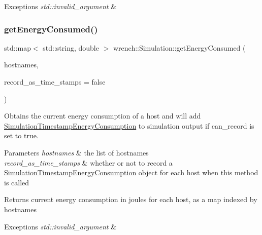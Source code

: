 \begin{DoxyExceptions}{Exceptions}
{\em std\+::invalid\+\_\+argument} & \\
\hline
\end{DoxyExceptions}
\mbox{\label{classwrench_1_1_simulation_ae5ea0778a82f576168e00dd8e492623f}} 
\subsubsection{\texorpdfstring{get\+Energy\+Consumed()}{getEnergyConsumed()}\hspace{0.1cm}{\footnotesize\ttfamily [2/2]}}
{\footnotesize\ttfamily std\+::map$<$ std\+::string, double $>$ wrench\+::\+Simulation\+::get\+Energy\+Consumed (\begin{DoxyParamCaption}\item[{const std\+::vector$<$ std\+::string $>$ \&}]{hostnames,  }\item[{bool}]{record\+\_\+as\+\_\+time\+\_\+stamps = {\ttfamily false} }\end{DoxyParamCaption})}



Obtains the current energy consumption of a host and will add \hyperlink{classwrench_1_1_simulation_timestamp_energy_consumption}{Simulation\+Timestamp\+Energy\+Consumption} to simulation output if can\+\_\+record is set to true. 


\begin{DoxyParams}{Parameters}
{\em hostnames} & the list of hostnames \\
\hline
{\em record\+\_\+as\+\_\+time\+\_\+stamps} & whether or not to record a \hyperlink{classwrench_1_1_simulation_timestamp_energy_consumption}{Simulation\+Timestamp\+Energy\+Consumption} object for each host when this method is called \\
\hline
\end{DoxyParams}
\begin{DoxyReturn}{Returns}
current energy consumption in joules for each host, as a map indexed by hostnames 
\end{DoxyReturn}

\begin{DoxyExceptions}{Exceptions}
{\em std\+::invalid\+\_\+argument} & \\
\hline
\end{DoxyExceptions}
\mbox{\label{classwrench_1_1_simulation_ae74b3ff1b394b4bc2986190412f4f32b}} 
